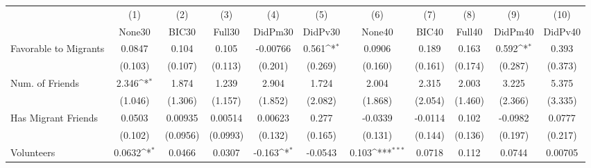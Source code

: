 {
\def\sym#1{\ifmmode^{#1}\else\(^{#1}\)\fi}
\begin{tabular}{l*{10}{c}}
\toprule
            &\multicolumn{1}{c}{(1)}&\multicolumn{1}{c}{(2)}&\multicolumn{1}{c}{(3)}&\multicolumn{1}{c}{(4)}&\multicolumn{1}{c}{(5)}&\multicolumn{1}{c}{(6)}&\multicolumn{1}{c}{(7)}&\multicolumn{1}{c}{(8)}&\multicolumn{1}{c}{(9)}&\multicolumn{1}{c}{(10)}\\
            &\multicolumn{1}{c}{None30}&\multicolumn{1}{c}{BIC30}&\multicolumn{1}{c}{Full30}&\multicolumn{1}{c}{DidPm30}&\multicolumn{1}{c}{DidPv30}&\multicolumn{1}{c}{None40}&\multicolumn{1}{c}{BIC40}&\multicolumn{1}{c}{Full40}&\multicolumn{1}{c}{DidPm40}&\multicolumn{1}{c}{DidPv40}\\
\midrule
Favorable to Migrants&      0.0847         &       0.104         &       0.105         &    -0.00766         &       0.561\sym{*}  &      0.0906         &       0.189         &       0.163         &       0.592\sym{*}  &       0.393         \\
            &     (0.103)         &     (0.107)         &     (0.113)         &     (0.201)         &     (0.269)         &     (0.160)         &     (0.161)         &     (0.174)         &     (0.287)         &     (0.373)         \\
\addlinespace
Num. of Friends&       2.346\sym{*}  &       1.874         &       1.239         &       2.904         &       1.724         &       2.004         &       2.315         &       2.003         &       3.225         &       5.375         \\
            &     (1.046)         &     (1.306)         &     (1.157)         &     (1.852)         &     (2.082)         &     (1.868)         &     (2.054)         &     (1.460)         &     (2.366)         &     (3.335)         \\
\addlinespace
Has Migrant Friends&      0.0503         &     0.00935         &     0.00514         &     0.00623         &       0.277         &     -0.0339         &     -0.0114         &       0.102         &     -0.0982         &      0.0777         \\
            &     (0.102)         &    (0.0956)         &    (0.0993)         &     (0.132)         &     (0.165)         &     (0.131)         &     (0.144)         &     (0.136)         &     (0.197)         &     (0.217)         \\
\addlinespace
Volunteers  &      0.0632\sym{*}  &      0.0466         &      0.0307         &      -0.163\sym{*}  &     -0.0543         &       0.103\sym{***}&      0.0718         &       0.112         &      0.0744         &     0.00705         \\

\end{tabular}}
